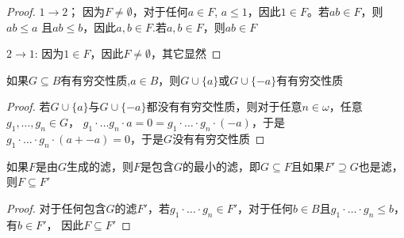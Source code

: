 \documentclass[11pt]{article}
\begin{document}
\begin{proof}
\(1\to 2\)； 因为\(F\neq\emptyset\)，对于任何\(a\in F\), \(a\le 1\)，因此\(1\in F\)。若\(ab\in F\)，则\(ab\le a\)
且\(ab\le b\)，因此\(a,b\in F\).若\(a,b\in F\)，则\(ab\in F\)

\(2\to 1\): 因为\(1\in F\)，因此\(F\neq\emptyset\)，其它显然
\end{proof}

\begin{exercise}[1.2.5]
如果\(G\subseteq B\)有有穷交性质,\(a\in B\)，则\(G\cup\{a\}\)或\(G\cup\{-a\}\)有有穷交性质
\end{exercise}

\begin{proof}
若\(G\cup\{a\}\)与\(G\cup\{-a\}\)都没有有穷交性质，则对于任意\(n\in\omega\)，任意\(g_1,\dots,g_n\in G\)，
\(g_1\cdot \dots g_n\cdot a=0=g_1\cdot\dots\cdot g_n\cdot(-a)\)，于是\(g_1\cdot\dots\cdot g_n\cdot(a+-a)=0\)，于是\(G\)没有有穷交性质
\end{proof}

\begin{exercise}[1.2.7]
如果\(F\)是由\(G\)生成的滤，则\(F\)是包含\(G\)的最小的滤，即\(G\subseteq F\)且如果\(F'\supseteq G\)也是滤，
则\(F\subseteq F'\)
\end{exercise}

\begin{proof}
对于任何包含\(G\)的滤\(F'\)，若\(g_1\cdot\dots\cdot g_n\in F'\)，对于任何\(b\in B\)且\(g_1\cdot\dots\cdot g_n\le b\)，有\(b\in F'\)，
因此\(F\subseteq F'\)
\end{proof}
\end{document}
